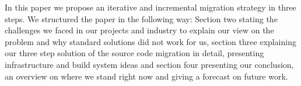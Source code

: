 In this paper we propose an iterative and incremental migration strategy in
three steps. We structured the paper in the following way: Section two stating
the challenges we faced in our projects and industry to explain our view on the
problem and why standard solutions did not work for us, section three explaining
our three step solution of the source code migration in detail, presenting
infrastructure and build system ideas and section four presenting our
conclusion, an overview on where we stand right now and giving a forecast on
future work.

